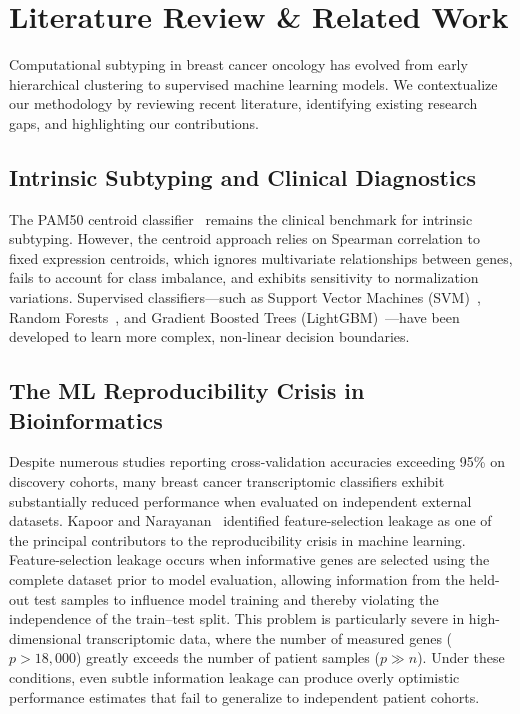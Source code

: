 \documentclass[10pt,a4paper,twocolumn]{article}
\begin{document}
\section{Literature Review \& Related Work}
Computational subtyping in breast cancer oncology has evolved from early hierarchical clustering to supervised machine learning models. We contextualize our methodology by reviewing recent literature, identifying existing research gaps, and highlighting our contributions.

\subsection{Intrinsic Subtyping and Clinical Diagnostics}
The PAM50 centroid classifier~\cite{parker2009} remains the clinical benchmark for intrinsic subtyping. However, the centroid approach relies on Spearman correlation to fixed expression centroids, which ignores multivariate relationships between genes, fails to account for class imbalance, and exhibits sensitivity to normalization variations. Supervised classifiers---such as Support Vector Machines (SVM)~\cite{cortes1995}, Random Forests~\cite{breiman2001}, and Gradient Boosted Trees (LightGBM)~\cite{ke2017}---have been developed to learn more complex, non-linear decision boundaries.

\subsection{The ML Reproducibility Crisis in Bioinformatics}
Despite numerous studies reporting cross-validation accuracies exceeding 95\% on discovery cohorts, many breast cancer transcriptomic classifiers exhibit substantially reduced performance when evaluated on independent external datasets. Kapoor and Narayanan~\cite{kapoor2022} identified feature-selection leakage as one of the principal contributors to the reproducibility crisis in machine learning. Feature-selection leakage occurs when informative genes are selected using the complete dataset prior to model evaluation, allowing information from the held-out test samples to influence model training and thereby violating the independence of the train--test split. This problem is particularly severe in high-dimensional transcriptomic data, where the number of measured genes ($p > 18{,}000$) greatly exceeds the number of patient samples ($p \gg n$). Under these conditions, even subtle information leakage can produce overly optimistic performance estimates that fail to generalize to independent patient cohorts.
\end{document}
